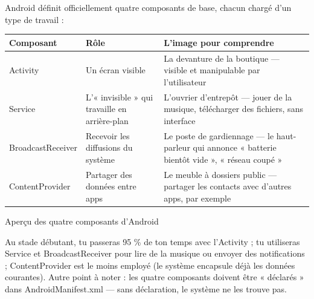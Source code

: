 


Android définit officiellement quatre composants de base, chacun chargé d'un type de travail :

\begin{center}
\begin{tabularx}{\linewidth}{|X|X|X|}
\hline
\textbf{Composant} & \textbf{Rôle} & \textbf{L'image pour comprendre} \tabularnewline
\hline
Activity & Un écran visible & La devanture de la boutique — visible et manipulable par l'utilisateur \tabularnewline
Service & L'« invisible » qui travaille en arrière-plan & L'ouvrier d'entrepôt — jouer de la musique, télécharger des fichiers, sans interface \tabularnewline
BroadcastReceiver & Recevoir les diffusions du système & Le poste de gardiennage — le haut-parleur qui annonce « batterie bientôt vide », « réseau coupé » \tabularnewline
ContentProvider & Partager des données entre apps & Le meuble à dossiers public — partager les contacts avec d'autres apps, par exemple \tabularnewline
\hline
\end{tabularx}
\end{center}

\begin{center}\small\color{gray}Aperçu des quatre composants d'Android\end{center}

Au stade débutant, tu passeras 95 \% de ton temps avec l'Activity ; tu utiliseras Service et BroadcastReceiver pour lire de la musique ou envoyer des notifications ; ContentProvider est le moins employé (le système encapsule déjà les données courantes). Autre point à noter : les quatre composants doivent être « déclarés » dans AndroidManifest.xml — sans déclaration, le système ne les trouve pas.


